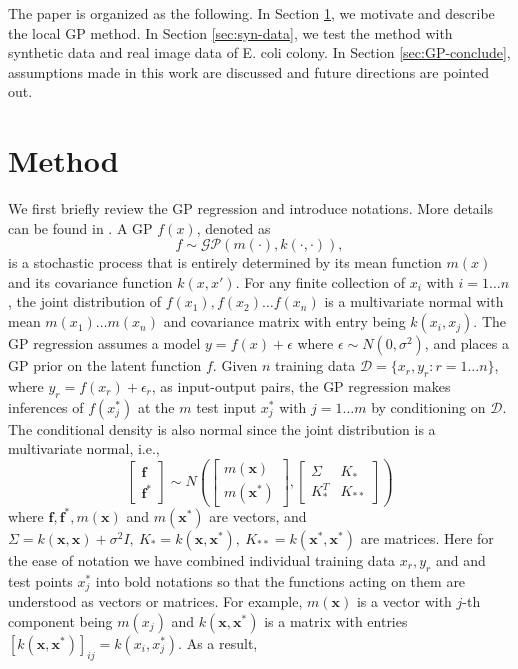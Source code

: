 \documentclass[smallextended,natbib]{svjour3}       %
\begin{document}
The paper is organized as the following. In Section \ref{sec:GP-method}, we motivate and describe the local GP method. In Section \ref{sec:syn-data}, we test the method with synthetic data and real image data of E. coli colony. In Section \ref{sec:GP-conclude}, assumptions made in this work are discussed and future directions are pointed out.

\section{Method} \label{sec:GP-method}
We first briefly review the GP regression and introduce notations. More details can be found in \citep{Rasmussen2006}. A GP $f(x)$, denoted as $$f\sim\mathcal{GP}(m(\cdot),k(\cdot,\cdot)),$$ is a stochastic process that is entirely determined by its mean function $m(x)$ and its covariance function $k(x,x')$. For any finite collection of $x_{i}$ with $i=1\ldots n$, the joint distribution of $f(x_{1}),f(x_{2})\ldots f(x_{n})$ is a multivariate normal with mean $m(x_{1})\ldots m(x_{n})$ and covariance matrix with entry being $k(x_{i},x_{j})$. The GP regression assumes a model $y=f(x)+\epsilon$ where $\epsilon\sim N(0,\sigma^{2})$, and places a GP prior on the latent function $f$. Given $n$ training data $\mathcal{D}=\{x_{r},y_{r}:r=1\ldots n\}$, where $y_{r}=f(x_{r})+\epsilon_{r}$, as input-output pairs, the GP regression makes inferences of $f(x_{j}^{*})$ at the $m$ test input $x_{j}^{*}$ with $j=1\ldots m$ by conditioning on $\mathcal{D}$. The conditional density is also normal since the joint distribution is a multivariate normal, i.e., 
\[
\begin{bmatrix}\mathbf{f}\\
\mathbf{f}^{*}
\end{bmatrix}\sim N(\begin{bmatrix}m(\mathbf{x})\\
m(\mathbf{x}^{*})
\end{bmatrix},\begin{bmatrix}\Sigma & K_{*}\\
K_{*}^{T} & K_{**}
\end{bmatrix})
\]
where $\mathbf{f},\mathbf{f}^{*},m(\mathbf{x})$ and $m(\mathbf{x}^{*})$ are vectors, and $\Sigma=k(\mathbf{x},\mathbf{x})+\sigma^{2}I,\ K_{*}=k(\mathbf{x},\mathbf{x}^{*}),\ K_{**}=k(\mathbf{x}^{*},\mathbf{x}^{*})$ are matrices. Here for the ease of notation we have combined individual training data $x_{r},y_{r}$ and and test points $x_{j}^{*}$ into bold notations so that the functions acting on them are understood as vectors or matrices. For example, $m(\mathbf{x})$ is a vector with $j$-th component being $m(x_{j})$ and $k(\mathbf{x},\mathbf{x}^{*})$ is a matrix with entries $[k(\mathbf{x},\mathbf{x}^{*})]_{ij}=k(x_{i},x_{j}^{*})$. As a result, 
\end{document}
